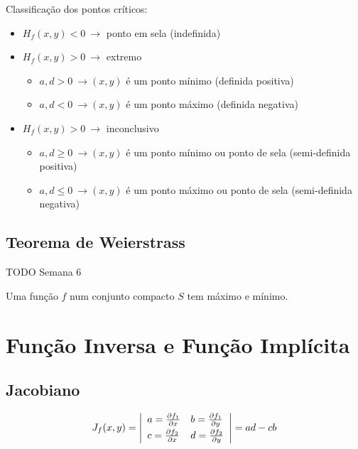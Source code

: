 \documentclass[11pt, a4paper]{article}
\begin{document}
Classificação dos pontos críticos:
\begin{itemize}
    \item $H_f(x,y) < 0 \ \rightarrow$ ponto em sela (indefinida)
    \item $H_f(x,y) > 0 \ \rightarrow$ extremo
          \begin{itemize}
              \item $a, d > 0 \ \rightarrow (x,y)$ é um ponto mínimo (definida positiva)
              \item $a, d < 0 \ \rightarrow (x,y)$ é um ponto máximo (definida negativa)
          \end{itemize}
    \item $H_f(x,y) > 0 \ \rightarrow$ inconclusivo
          \begin{itemize}
              \item $a, d \geq 0 \ \rightarrow (x,y)$ é um ponto mínimo ou ponto de sela (semi-definida positiva)
              \item $a, d \leq 0 \ \rightarrow (x,y)$ é um ponto máximo ou ponto de sela (semi-definida negativa)
          \end{itemize}
\end{itemize}

\subsection{Teorema de Weierstrass}

TODO Semana 6

Uma função $f$ num conjunto compacto $S$ tem máximo e mínimo.

\section{Função Inversa e Função Implícita}

\subsection{Jacobiano}

\begin{equation*}
    J_f(x, y) =
    \left\lvert
    \begin{array}{l l}
        a = \frac{\partial f_1}{\partial x} &
        b = \frac{\partial f_1}{\partial y} \vspace{2pt} \\
        c = \frac{\partial f_2}{\partial x} &
        d = \frac{\partial f_2}{\partial y}
    \end{array}
    \right\rvert =
    ad - cb
\end{equation*}
\end{document}
